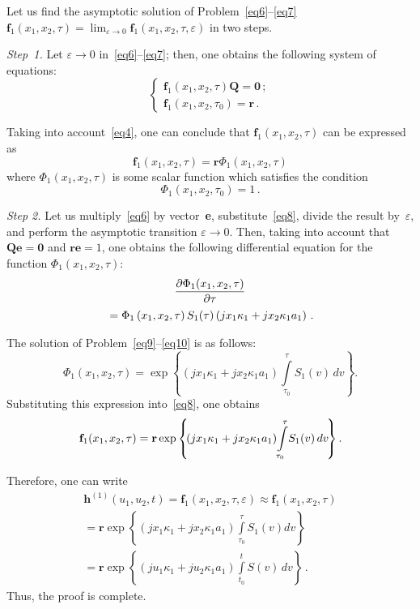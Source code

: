\begin{multicols}{2}
Let us find the asymptotic solution of Problem~\eqref{eq6}--\eqref{eq7} 
$\mathbf{f}_1(x_1,x_2,\tau)=
\lim\nolimits_{\varepsilon\to 0}\mathbf{f}_1(x_1, x_2,\tau,\varepsilon)$
in two steps.

\textit{Step~1.} Let $\varepsilon\to 0$ in~\eqref{eq6}--\eqref{eq7}; 
then, one obtains the following system of equations:
$$
\left\{ 
\begin{array}{l}
\mathbf{f}_1\left(x_1,x_2,\tau\right)\mathbf{Q}=\mathbf{0}\,;\\[6pt]
\mathbf{f}_1\left(x_1,x_2,\tau_0\right)=\mathbf{r}\,.
\end{array}
\right.
$$

Taking into account~\eqref{eq4}, one can conclude that $\mathbf{f}_1(x_1,x_2,\tau)$  
can be expressed as
\begin{equation}
\label{eq8}
\mathbf{f}_1(x_1,x_2,\tau)=\mathbf{r}\Phi_1(x_1,x_2,\tau)
\end{equation}
where $\Phi_1(x_1,x_2,\tau)$ is some scalar function which satisfies the condition
\begin{equation}
\label{eq9}
\Phi_1(x_1,x_2,\tau_0)=1\,.
\end{equation}

\textit{Step 2.} Let us multiply~\eqref{eq6} by vector~{\bf e}, substitute~\eqref{eq8}, 
divide the result by~$\varepsilon$, and perform the asymptotic transition 
$\varepsilon\to 0$. Then, taking into account that $\mathbf{Qe}=\mathbf{0}$ 
and $\mathbf{re}=1$, one obtains the following differential equation 
for the function $\Phi_1(x_1,x_2,\tau)$:
\begin{multline}
\label{eq10}
\displaystyle\frac{\displaystyle \partial\Phi_1(x_1,x_2,\tau)\mathstrut}{\displaystyle \partial\tau\mathstrut}\\
{}=
\Phi_1\left(x_1,x_2,\tau\right)S_1(\tau)\left(jx_1\kappa_1+jx_2\kappa_1a_1\right)\,.
\end{multline}

The solution of Problem~\eqref{eq9}--\eqref{eq10} is as follows:
$$
\Phi_1(x_1,x_2,\tau)=\exp\left\{ \!\left(jx_1\kappa_1+jx_2\kappa_1a_1\right)\!
\int\limits_{\tau_0}^{\tau}\!S_1(v)\,dv\right\}.
$$
Substituting this expression into~\eqref{eq8}, one obtains
$$
\mathbf{f}_1(x_1,x_2,\tau)=
\mathbf{r}\exp\left\{ \!\left(jx_1\kappa_1+jx_2\kappa_1a_1\right)
\!\int\limits_{\tau_0}^{\tau}\!S_1(v)\,dv\!\right\}.\hspace*{-0.69418pt}
$$

Therefore, one can write
\begin{multline*}
\mathbf{h}^{(1)}(u_1,u_2,t)=\mathbf{f}_1\left(x_1,x_2,\tau,\varepsilon\right)\approx
\mathbf{f}_1\left(x_1,x_2,\tau\right)
\\
{}=\mathbf{r}\exp\left\{ \left(jx_1\kappa_1+jx_2\kappa_1a_1\right)
\int\limits_{\tau_0}^{\tau}S_1(v)dv\right\}\\
{} =
\mathbf{r}\exp\left\{ \left( ju_1\kappa_1+ju_2\kappa_1a_1\right) 
\int\limits_{t_0}^tS(v)\,dv\right\} \,.
\end{multline*}
Thus, the proof is complete.



\end{multicols}
